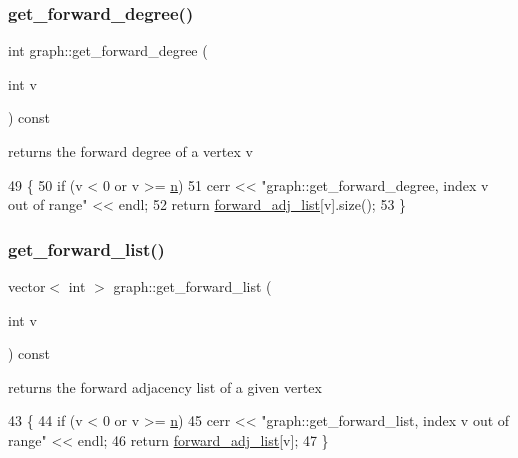 \subsubsection{\texorpdfstring{get\+\_\+forward\+\_\+degree()}{get\_forward\_degree()}}
{\footnotesize\ttfamily int graph\+::get\+\_\+forward\+\_\+degree (\begin{DoxyParamCaption}\item[{int}]{v }\end{DoxyParamCaption}) const}



returns the forward degree of a vertex v 


\begin{DoxyCode}
49                                         \{
50   \textcolor{keywordflow}{if} (v < 0 or v >= \hyperlink{classgraph_ac8b3474ce95c04087c312508ec1443b6}{n})
51     cerr << \textcolor{stringliteral}{"graph::get\_forward\_degree, index v out of range"} << endl;
52   \textcolor{keywordflow}{return} \hyperlink{classgraph_a7d6441850d586d6a99fb73df57b70362}{forward\_adj\_list}[v].size();
53 \}
\end{DoxyCode}
\mbox{\label{classgraph_aa8fbee52a7b3604dbbd9175040c7ead5}} 
\subsubsection{\texorpdfstring{get\+\_\+forward\+\_\+list()}{get\_forward\_list()}}
{\footnotesize\ttfamily vector$<$ int $>$ graph\+::get\+\_\+forward\+\_\+list (\begin{DoxyParamCaption}\item[{int}]{v }\end{DoxyParamCaption}) const}



returns the forward adjacency list of a given vertex 


\begin{DoxyCode}
43                                               \{
44   \textcolor{keywordflow}{if} (v < 0 or v >= \hyperlink{classgraph_ac8b3474ce95c04087c312508ec1443b6}{n})
45     cerr << \textcolor{stringliteral}{"graph::get\_forward\_list, index v out of range"} << endl;
46   \textcolor{keywordflow}{return} \hyperlink{classgraph_a7d6441850d586d6a99fb73df57b70362}{forward\_adj\_list}[v];
47 \}
\end{DoxyCode}
\mbox{\label{classgraph_a70a6e0e4e0a874ab122405abd38f83cd}} 
